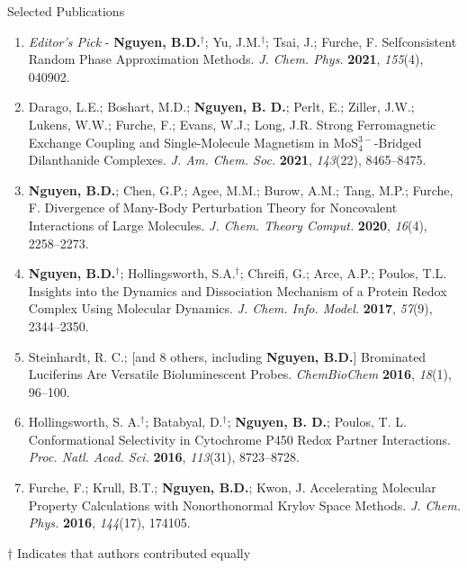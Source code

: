 \documentclass{resume} %
\begin{document}
\begin{rSection}{Selected Publications}

\begin{enumerate}

\item {\em Editor's Pick} - \textbf{Nguyen, B.D.}$^\dagger$; Yu, J.M.$^\dagger$; Tsai, J.;
  Furche, F. Selfconsistent Random Phase Approximation Methods.
  \textit{J. Chem. Phys.} \textbf{2021}, \textit{155}(4), 040902.

\item Darago, L.E.; Boshart, M.D.; \textbf{Nguyen, B. D.}; Perlt, E.;
  Ziller, J.W.; Lukens, W.W.; Furche, F.; Evans, W.J.; Long, J.R.
  Strong Ferromagnetic Exchange Coupling and Single-Molecule Magnetism in
  MoS$_4^{3-}$-Bridged Dilanthanide Complexes. \textit{J. Am. Chem. Soc.}
  \textbf{2021}, \textit{143}(22), 8465--8475.

      
\item \textbf{Nguyen, B.D.}; Chen, G.P.; Agee, M.M.; Burow, A.M.; Tang, M.P.;
  Furche, F. Divergence of Many-Body Perturbation Theory for Noncovalent Interactions
  of Large Molecules. \textit{J. Chem. Theory Comput.} \textbf{2020}, \textit{16}(4),
  2258--2273.

\item \textbf{Nguyen, B.D.}$^\dagger$; Hollingsworth, S.A.$^\dagger$; Chreifi, G.;
  Arce, A.P.; Poulos, T.L. Insights into the Dynamics and Dissociation Mechanism
  of a Protein Redox Complex Using Molecular Dynamics. \textit{J. Chem. Info. Model.}
  \textbf{2017}, \textit{57}(9), 2344--2350.

\item Steinhardt, R. C.; [and 8 others, including
  \textbf{Nguyen, B.D.}] Brominated Luciferins Are Versatile Bioluminescent Probes.
  \textit{ChemBioChem} \textbf{2016}, \textit{18}(1), 96--100.

\item Hollingsworth, S. A.$^\dagger$; Batabyal, D.$^\dagger$; \textbf{Nguyen, B. D.};
  Poulos, T. L. Conformational Selectivity in Cytochrome P450 Redox Partner
  Interactions. \textit{Proc. Natl. Acad. Sci.} \textbf{2016}, \textit{113}(31),
  8723--8728.

\item Furche, F.; Krull, B.T.; \textbf{Nguyen, B.D.}; Kwon, J. Accelerating
  Molecular Property Calculations with Nonorthonormal Krylov Space Methods.
  \textit{J. Chem. Phys.} \textbf{2016}, \textit{144}(17), 174105.
  
\end{enumerate}

$\dagger$ Indicates that authors contributed equally

\end{rSection}
\end{document}
